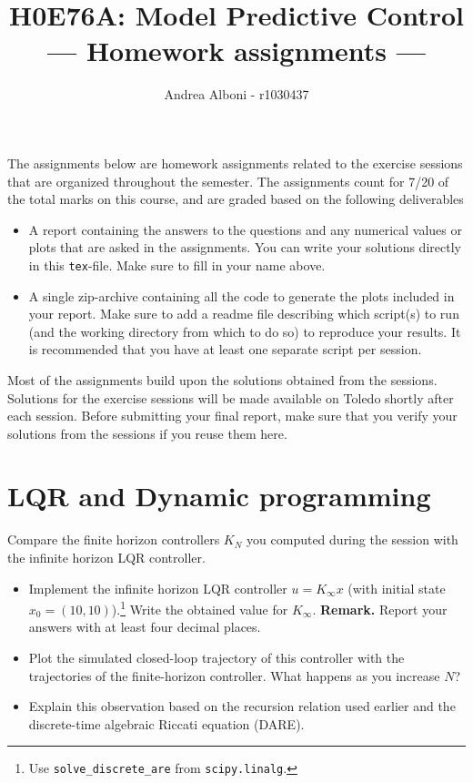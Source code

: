 \documentclass[]{article}
\title{H0E76A: Model Predictive Control\\\large--- Homework assignments ---}
\author{Andrea Alboni - r1030437}
\newcommand{\assignmentweight}{7/20}
\newcommand{\toledo}{Toledo}
\begin{document}
\maketitle



The assignments below are homework assignments related to the exercise sessions that are organized throughout the 
semester.
The assignments count for \assignmentweight{} of the total marks on this course, and are graded based on the following deliverables
\begin{deliverables}
\begin{itemize}
	\item A report containing the answers to the questions and any numerical values or plots that are asked in the assignments. 
	You can write your solutions directly in this \texttt{tex}-file. Make sure to fill in your name above. 
	\item A single zip-archive containing all the code to generate the plots included in your report. 
	Make sure to add a readme file describing which script(s) to run (and the working directory from which to do so) to reproduce your results.
	It is recommended that you have at least one separate script per session.
\end{itemize}
\end{deliverables}
Most of the assignments build upon the solutions obtained from the sessions.
Solutions for the exercise sessions will be made available on \toledo{} shortly after each session. 
Before submitting your final report, make sure that you verify your solutions from the sessions if you reuse them here. 

\section{LQR and Dynamic programming}
\begin{assignment} Compare the finite horizon controllers $K_{N}$ you computed during the session with the infinite horizon LQR controller.
\begin{itemize} 
	\item Implement the infinite horizon LQR controller $u = K_{\infty} x$ (with initial state $x_0 = (10,10)$).\footnote{Use \texttt{solve\_discrete\_are} from \texttt{scipy.linalg}.} Write the obtained value for $K_\infty$.
	\textbf{Remark.} Report your answers with at least four decimal places.
	\item Plot the simulated closed-loop trajectory of this controller with the trajectories of the finite-horizon controller. What happens as 
	you increase $N$?
	\item Explain this observation based on the recursion relation used earlier and 
	the discrete-time algebraic Riccati equation (DARE).
\end{itemize}
\end{assignment}
\end{document}
